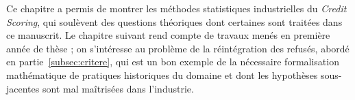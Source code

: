 
\bigskip

Ce chapitre a permis de montrer les méthodes statistiques industrielles du \textit{Credit Scoring}, qui soulèvent des questions théoriques dont certaines sont traitées dans ce manuscrit. Le chapitre suivant rend compte de travaux menés en première année de thèse ; on s'intéresse au problème de la réintégration des refusés, abordé en partie~\ref{subsec:critere}, qui est un bon exemple de la nécessaire formalisation mathématique de pratiques historiques du domaine et dont les hypothèses sous-jacentes sont mal maîtrisées dans l'industrie.


\printbibliography[heading=subbibliography, title=Références du chapitre 1]